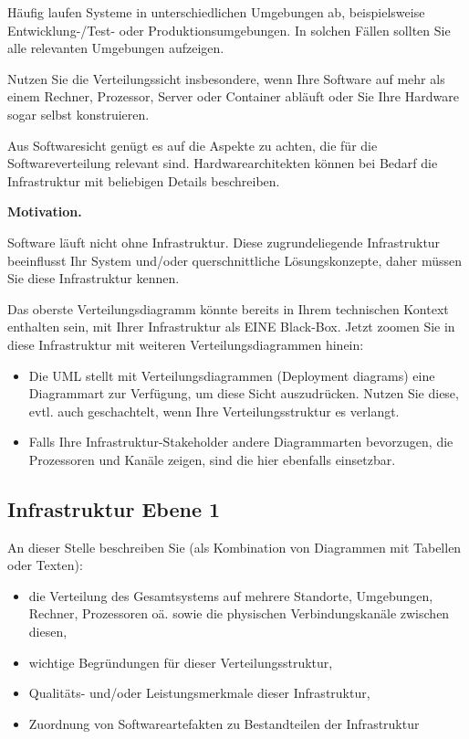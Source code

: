 \documentclass[]{article}
\begin{document}
Häufig laufen Systeme in unterschiedlichen Umgebungen ab, beispielsweise
Entwicklung-/Test- oder Produktionsumgebungen. In solchen Fällen sollten
Sie alle relevanten Umgebungen aufzeigen.

Nutzen Sie die Verteilungssicht insbesondere, wenn Ihre Software auf
mehr als einem Rechner, Prozessor, Server oder Container abläuft oder
Sie Ihre Hardware sogar selbst konstruieren.

Aus Softwaresicht genügt es auf die Aspekte zu achten, die für die
Softwareverteilung relevant sind. Hardwarearchitekten können bei Bedarf
die Infrastruktur mit beliebigen Details beschreiben.

\textbf{Motivation.}

Software läuft nicht ohne Infrastruktur. Diese zugrundeliegende
Infrastruktur beeinflusst Ihr System und/oder querschnittliche
Lösungskonzepte, daher müssen Sie diese Infrastruktur kennen.

Das oberste Verteilungsdiagramm könnte bereits in Ihrem technischen
Kontext enthalten sein, mit Ihrer Infrastruktur als EINE Black-Box.
Jetzt zoomen Sie in diese Infrastruktur mit weiteren
Verteilungsdiagrammen hinein:

\begin{itemize}
\item
  Die UML stellt mit Verteilungsdiagrammen (Deployment diagrams) eine
  Diagrammart zur Verfügung, um diese Sicht auszudrücken. Nutzen Sie
  diese, evtl. auch geschachtelt, wenn Ihre Verteilungsstruktur es
  verlangt.
\item
  Falls Ihre Infrastruktur-Stakeholder andere Diagrammarten bevorzugen,
  die Prozessoren und Kanäle zeigen, sind die hier ebenfalls einsetzbar.
\end{itemize}

\subsection{Infrastruktur Ebene 1}\label{_infrastruktur_ebene_1}

An dieser Stelle beschreiben Sie (als Kombination von Diagrammen mit
Tabellen oder Texten):

\begin{itemize}
\item
  die Verteilung des Gesamtsystems auf mehrere Standorte, Umgebungen,
  Rechner, Prozessoren oä. sowie die physischen Verbindungskanäle
  zwischen diesen,
\item
  wichtige Begründungen für dieser Verteilungsstruktur,
\item
  Qualitäts- und/oder Leistungsmerkmale dieser Infrastruktur,
\item
  Zuordnung von Softwareartefakten zu Bestandteilen der Infrastruktur
\end{itemize}
\end{document}
